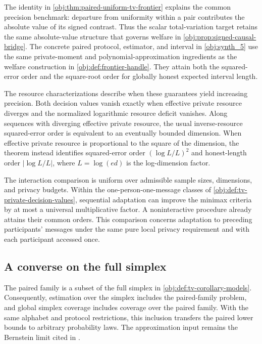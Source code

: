 \documentclass[11pt]{article}
\begin{document}
The identity in \cref{obj:thm:paired-uniform-tv-frontier} explains the common precision benchmark: departure from uniformity within a pair contributes the absolute value of its signed contrast. Thus the scalar total-variation target retains the same absolute-value structure that governs welfare in \cref{obj:prop:signed-causal-bridge}. The concrete paired protocol, estimator, and interval in \cref{obj:synth_5} use the same private-moment and polynomial-approximation ingredients as the welfare construction in \cref{obj:def:frontier-handle}. They attain both the squared-error order and the square-root order for globally honest expected interval length.

The resource characterizations describe when these guarantees yield increasing precision. Both decision values vanish exactly when effective private resource diverges and the normalized logarithmic resource deficit vanishes. Along sequences with diverging effective private resource, the usual inverse-resource squared-error order is equivalent to an eventually bounded dimension. When effective private resource is proportional to the square of the dimension, the theorem instead identifies squared-error order \((\log L/L)^2\) and honest-length order \(|\log L/L|\), where \(L=\log(ed)\) is the log-dimension factor.

The interaction comparison is uniform over admissible sample sizes, dimensions, and privacy budgets. Within the one-person-one-message classes of \cref{obj:def:tv-private-decision-values}, sequential adaptation can improve the minimax criteria by at most a universal multiplicative factor. A noninteractive procedure already attains their common orders. This comparison concerns adaptation to preceding participants' messages under the same pure local privacy requirement and with each participant accessed once.

\subsection{A converse on the full simplex}

The paired family is a subset of the full simplex in \cref{obj:def:tv-corollary-models}. Consequently, estimation over the simplex includes the paired-family problem, and global simplex coverage includes coverage over the paired family. With the same alphabet and protocol restrictions, this inclusion transfers the paired lower bounds to arbitrary probability laws. The approximation input remains the Bernstein limit cited in \citet[Section 3.1, p.~8]{CaiLow2011Nonsmooth}.
\end{document}
